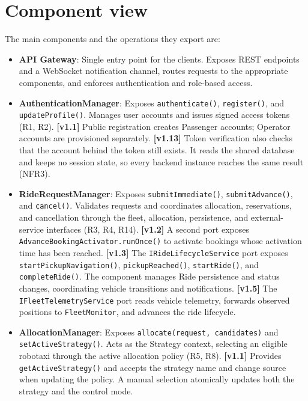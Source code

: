 \documentclass[11pt,a4paper,oneside]{report}
\newcommand{\code}[1]{\texttt{#1}}
\begin{document}
\hypertarget{component-view}{%
\section{Component view}\label{component-view}}
The main components and the operations they export are:

\begin{itemize}

\item
  \textbf{API Gateway}: Single entry point for the clients.
  Exposes REST endpoints and a WebSocket notification channel,
  routes requests to the appropriate components, and enforces
  authentication and role-based access.

\item
  \textbf{AuthenticationManager}: Exposes \code{authenticate()},
  \code{register()}, and \code{updateProfile()}.
  Manages user accounts and issues signed access tokens (R1, R2).
  \textbf{[v1.1]} Public registration creates Passenger accounts;
  Operator accounts are provisioned separately.
  \textbf{[v1.13]} Token verification also checks that the account
  behind the token still exists. It reads the shared database and keeps
  no session state, so every backend instance reaches the same result
  (NFR3).

\item
  \textbf{RideRequestManager}: Exposes \code{submitImmediate()},
  \code{submitAdvance()}, and \code{cancel()}.
  Validates requests and coordinates allocation, reservations,
  and cancellation through the fleet, allocation, persistence,
  and external-service interfaces (R3, R4, R14).
  \textbf{[v1.2]} A second port exposes
  \code{AdvanceBookingActivator.runOnce()} to activate bookings whose activation time has been reached.
  \textbf{[v1.3]} The \code{IRideLifecycleService} port exposes
  \code{startPickupNavigation()}, \code{pickupReached()},
  \code{startRide()}, and \code{completeRide()}.
  The component manages Ride persistence and status changes,
  coordinating vehicle transitions and notifications.
  \textbf{[v1.5]} The \code{IFleetTelemetryService} port reads
  vehicle telemetry, forwards observed positions to
  \code{FleetMonitor}, and advances the ride lifecycle.

\item
  \textbf{AllocationManager}: Exposes
  \code{allocate(request, candidates)} and
  \code{setActiveStrategy()}.
  Acts as the Strategy context, selecting an eligible robotaxi
  through the active allocation policy (R5, R8).
  \textbf{[v1.1]} Provides \code{getActiveStrategy()} and accepts
  the strategy name and change source when updating the policy.
  A manual selection atomically updates both the strategy and
  the control mode.


\end{itemize}
\end{document}
